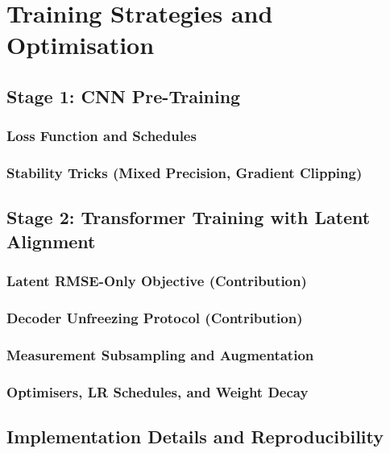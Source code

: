 \chapter{Training Strategies and Optimisation}
\section{Stage 1: CNN Pre-Training}
\subsection{Loss Function and Schedules}
\subsection{Stability Tricks (Mixed Precision, Gradient Clipping)}
\section{Stage 2: Transformer Training with Latent Alignment}
\subsection{Latent RMSE-Only Objective (Contribution)}
\subsection{Decoder Unfreezing Protocol (Contribution)}
\subsection{Measurement Subsampling and Augmentation}
\subsection{Optimisers, LR Schedules, and Weight Decay}
\section{Implementation Details and Reproducibility}
